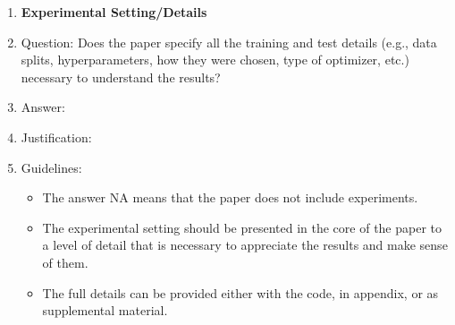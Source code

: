 \documentclass{article} %
\theoremstyle{definition}
\theoremstyle{remark}
\begin{document}
\begin{enumerate}
\item {\bf Experimental Setting/Details}
    \item[] Question: Does the paper specify all the training and test details (e.g., data splits, hyperparameters, how they were chosen, type of optimizer, etc.) necessary to understand the results?
    \item[] Answer: \answerTODO{} %
    \item[] Justification: \justificationTODO{}
    \item[] Guidelines:
    \begin{itemize}
        \item The answer NA means that the paper does not include experiments.
        \item The experimental setting should be presented in the core of the paper to a level of detail that is necessary to appreciate the results and make sense of them.
        \item The full details can be provided either with the code, in appendix, or as supplemental material.
    \end{itemize}


\end{enumerate}
\end{document}
